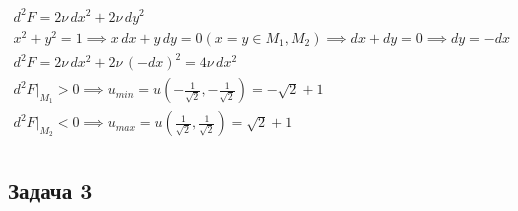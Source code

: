 \documentclass[a4paper,fleqn,12pt]{article}
\theoremstyle{definition}
\begin{document}
\begin{gather*}
d^2 F = 2\nu \, dx^2 + 2\nu \, dy^2\\
x^2 + y^2 = 1 \implies x\, dx + y\, dy = 0 (x=y \in M_1, M_2) \implies dx + dy = 0  \implies dy = -dx \\
d^2F= 2\nu \, dx^2 + 2\nu\, (-dx)^2 = 4\nu \, dx^2\\
d^2F \Big|_{M_1} >0 \implies u_{min} = u \left( -\frac{1}{\sqrt{2}}, -\frac{1}{\sqrt{2}}\right) = -\sqrt{2} + 1 \\
d^2F \Big|_{M_2} < 0 \implies u_{max} = u \left( \frac{1}{\sqrt{2}}, \frac{1}{\sqrt{2}}\right) = \sqrt{2} + 1 \\
\end{gather*}

\subsection*{Задача 3}
\end{document}
